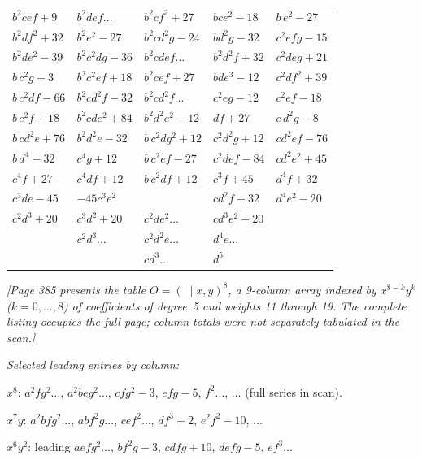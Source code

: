 \documentclass[11pt]{article}
\begin{document}
\begin{center}
{\begin{tabular}{|l|l|l|l|l|}
$b^{2}cef+9$ & $b^{2}def\ldots$ & $b^{2}cf^{2}+27$ & $bce^{2}-18$ & $b\,e^{2}-27$\\
$b^{2}df^{2}+32$ & $b^{2}e^{2}-27$ & $b^{2}cd^{2}g-24$ & $bd^{2}g-32$ & $c^{2}efg-15$\\
$b^{2}de^{2}-39$ & $b^{2}c^{2}dg-36$ & $b^{2}cdef\ldots$ & $b^{2}d^{2}f+32$ & $c^{2}deg+21$\\
$b\,c^{2}g-3$ & $b^{2}c^{2}ef+18$ & $b^{2}cef+27$ & $bde^{3}-12$ & $c^{2}df^{2}+39$\\
$b\,c^{2}df-66$ & $b^{2}cd^{2}f-32$ & $b^{2}cd^{2}f\ldots$ & $c^{2}eg-12$ & $c^{2}ef-18$\\
$b\,c^{2}f+18$ & $b^{2}cde^{2}+84$ & $b^{2}d^{2}e^{2}-12$ & $df+27$ & $c\,d^{2}g-8$\\
$b\,cd^{2}e+76$ & $b^{2}d^{2}e-32$ & $b\,c^{2}dg^{2}+12$ & $c^{2}d^{2}g+12$ & $cd^{2}ef-76$\\
$b\,d^{4}-32$ & $c^{4}g+12$ & $b\,c^{2}ef-27$ & $c^{2}def-84$ & $cd^{2}e^{2}+45$\\
$c^{4}f+27$ & $c^{4}df+12$ & $b\,c^{2}df+12$ & $c^{3}f+45$ & $d^{4}f+32$\\
$c^{3}de-45$ & $-45c^{3}e^{2}$ & & $cd^{2}f+32$ & $d^{4}e^{2}-20$\\
$c^{2}d^{3}+20$ & $c^{3}d^{2}+20$ & $c^{2}de^{2}\ldots$ & $cd^{3}e^{2}-20$ & \\
& $c^{2}d^{3}\ldots$ & $c^{2}d^{2}e\ldots$ & $d^{4}e\ldots$ & \\
& & $cd^{3}\ldots$ & $d^{5}$ & \\
\hline
\end{tabular}}
\end{center}

\newpage

\noindent
\textit{[Page 385 presents the table $O=(\;\mid x,y)^{8}$, a
9-column array indexed by $x^{8-k}y^{k}$ ($k=0,\ldots,8$) of
coefficients of degree~5 and weights 11 through 19.  The complete
listing occupies the full page; column totals were not separately
tabulated in the scan.]}

\medskip
\noindent
\textit{Selected leading entries by column:}
\smallskip

\noindent
$x^{8}$: $a^{2}fg^{2}\ldots$, $a^{2}beg^{2}\ldots$, $cfg^{2}-3$, $efg-5$, $f^{2}\ldots$, $\ldots$ (full series in scan).
\smallskip

\noindent
$x^{7}y$: $a^{2}bfg^{2}\ldots$, $abf^{2}g\ldots$, $cef^{2}\ldots$, $df^{3}+2$, $e^{2}f^{2}-10$, $\ldots$
\smallskip

\noindent
$x^{6}y^{2}$: leading $aefg^{2}\ldots$, $bf^{2}g-3$, $cd fg+10$, $defg-5$, $ef^{3}\ldots$
\smallskip
\end{document}
